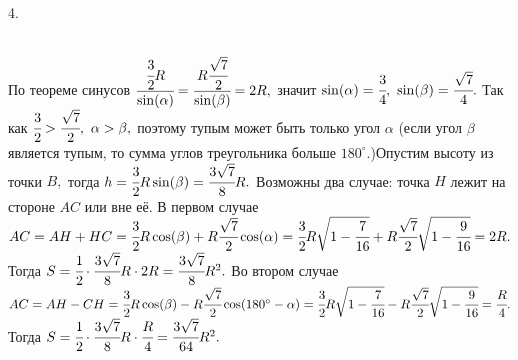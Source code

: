 4. \begin{figure}[ht!]
\end{figure}\\
По теореме синусов $\cfrac{\cfrac{3}{2}R}{\sin(\alpha)}=\cfrac{R\cfrac{\sqrt{7}}{2}}{\sin(\beta)}=2R,$ значит $\sin(\alpha)=\cfrac{3}{4},\ \sin(\beta)=\cfrac{\sqrt{7}}{4}.$ Так как $\cfrac{3}{2}>\cfrac{\sqrt{7}}{2},\ \alpha>\beta,$ поэтому тупым может быть только угол $\alpha$ (если угол $\beta$ является тупым, то сумма углов треугольника больше $180^\circ.$)Опустим высоту из точки $B,$ тогда $h=\cfrac{3}{2}R \sin(\beta)=\cfrac{3\sqrt{7}}{8}R.$ Возможны два случае: точка $H$ лежит на стороне $AC$ или вне её. В первом случае $AC=AH+HC=\cfrac{3}{2}R \cos(\beta)+R\cfrac{\sqrt{7}}{2}\cos(\alpha)=
\cfrac{3}{2}R \sqrt{1-\cfrac{7}{16}}+R\cfrac{\sqrt{7}}{2}\sqrt{1-\cfrac{9}{16}}=2R.$ Тогда $S=\cfrac{1}{2}\cdot\cfrac{3\sqrt{7}}{8}R\cdot
2R=\cfrac{3\sqrt{7}}{8}R^2.$ Во втором случае $AC=AH-CH=\cfrac{3}{2}R \cos(\beta)-R\cfrac{\sqrt{7}}{2}\cos(180^\circ-\alpha)=
\cfrac{3}{2}R \sqrt{1-\cfrac{7}{16}}-R\cfrac{\sqrt{7}}{2}\sqrt{1-\cfrac{9}{16}}=\cfrac{R}{4}.$ Тогда $S=\cfrac{1}{2}\cdot\cfrac{3\sqrt{7}}{8}R\cdot\cfrac{R}{4}=\cfrac{3\sqrt{7}}{64}R^2.$\\
